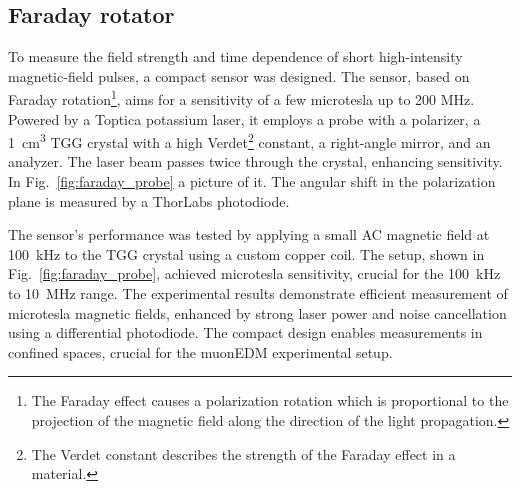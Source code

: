 \begin{refsection}
    \subsection{Faraday rotator}
        To measure the field strength and time dependence of short high-intensity magnetic-field pulses, a compact sensor was designed. 
        The sensor, based on Faraday rotation\footnote{The Faraday effect causes a polarization rotation which is proportional to the projection of the magnetic field along the direction of the light propagation.}, aims for a sensitivity of a few microtesla up to 200 MHz. 
        Powered by a Toptica potassium laser, it employs a probe with a polarizer, a \SI{1}{\cm\cubed} TGG crystal with a high Verdet\footnote{The Verdet constant describes the strength of the Faraday effect in a material.} constant, a right-angle mirror, and an analyzer. 
        The laser beam passes twice through the crystal, enhancing sensitivity. 
        In Fig.~\ref{fig:faraday_probe} a picture of it.
        The angular shift in the polarization plane is measured by a ThorLabs photodiode.
        
        \noindent
        The sensor's performance was tested by applying a small AC magnetic field at \SI{100}{kHz} to the TGG crystal using a custom copper coil. 
        The setup, shown in Fig.~\ref{fig:faraday_probe}, achieved microtesla sensitivity, crucial for the \SI{100}{kHz} to \SI{10}{MHz} range. 
        The experimental results demonstrate efficient measurement of microtesla magnetic fields, enhanced by strong laser power and noise cancellation using a differential photodiode. 
        The compact design enables measurements in confined spaces, crucial for the muonEDM experimental setup.


\end{refsection}
